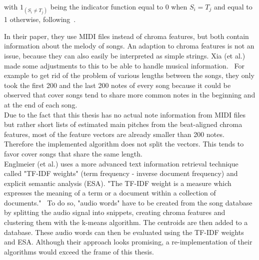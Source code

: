 \noindent with $1_{(S_i \neq T_j)}$ being the indicator function equal to 0 when $S_{i} = T_{j}$ and equal to 1 otherwise, following~\cite[p. 7]{chroma4}.

\noindent In their paper, they use MIDI files instead of chroma features, but both contain information about the melody of songs. An adaption to chroma features is not an issue, because they can also easily be interpreted as simple strings. 
\noindent Xia (et al.) made some adjustments to this to be able to handle musical information.~\cite[pp. 7ff]{chroma4} For example to get rid of the problem of various lengths between the songs, they only took the first 200 and the last 200 notes of every song because it could be observed that cover songs tend to share more common notes in the beginning and at the end of each song.\\
Due to the fact that this thesis has no actual note information from MIDI files but rather short lists of estimated main pitches from the beat-aligned chroma features, most of the feature vectors are already smaller than 200 notes. Therefore the implemented algorithm does not split the vectors. This tends to favor cover songs that share the same length. 
\ \\
Englmeier (et al.) uses a more advanced text information retrieval technique called "TF-IDF weights" (term frequency - inverse document frequency) and explicit semantic analysis (ESA). "The TF-IDF weight is a measure which expresses the meaning of a term or a document within a collection of documents."~\cite[p. 186]{chroma1}
To do so, "audio words" have to be created from the song database by splitting the audio signal into snippets, creating chroma features and clustering them with the k-means algorithm. The centroids are then added to a database. These audio words can then be evaluated using the TF-IDF weights and ESA.
Although their approach looks promising, a re-implementation of their algorithms would exceed the frame of this thesis.

